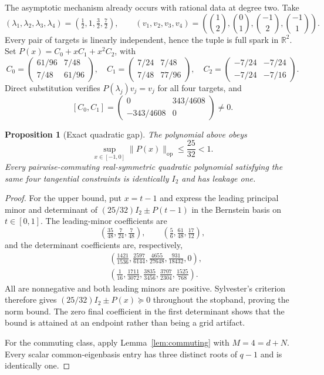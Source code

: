 \documentclass[11pt]{article}
\newtheorem{proposition}[theorem]{Proposition}
\theoremstyle{remark}
\newcommand{\R}{\mathbb{R}}
\newcommand{\op}{\mathrm{op}}
\begin{document}
The asymptotic mechanism already occurs with rational data at degree two.  Take
\[
 (\lambda_1,\lambda_2,\lambda_3,\lambda_4)
 =\left(\tfrac12,1,\tfrac32,\tfrac72\right),
 \qquad
 (v_1,v_2,v_3,v_4)
 =\left(
 \binom{1}{2},\binom{0}{1},\binom{-1}{2},\binom{-1}{1}
 \right).
\]
Every pair of targets is linearly independent, hence the tuple is full spark in
$\R^2$.  Set $P(x)=C_0+xC_1+x^2C_2$, with
\[
 C_0=\begin{pmatrix}61/96&7/48\\7/48&61/96\end{pmatrix},\quad
 C_1=\begin{pmatrix}7/24&7/48\\7/48&77/96\end{pmatrix},\quad
 C_2=\begin{pmatrix}-7/24&-7/24\\-7/24&-7/16\end{pmatrix}.
\]
Direct substitution verifies $P(\lambda_j)v_j=v_j$ for all four targets, and
\[
 [C_0,C_1]
 =\begin{pmatrix}0&343/4608\\-343/4608&0\end{pmatrix}\ne0.
\]

\begin{proposition}[Exact quadratic gap]\label{prop:quadratic}
The polynomial above obeys
\[
 \sup_{x\in[-1,0]}\|P(x)\|_{\op}\le\frac{25}{32}<1.
\]
Every pairwise-commuting real-symmetric quadratic polynomial satisfying the
same four tangential constraints is identically $I_2$ and has leakage one.
\end{proposition}

\begin{proof}
For the upper bound, put $x=t-1$ and express the leading principal minor and
determinant of $(25/32)I_2\pm P(t-1)$ in the Bernstein basis on $t\in[0,1]$.
The leading-minor coefficients are
\[
 \left(\tfrac{35}{48},\tfrac7{24},\tfrac7{48}\right),\qquad
 \left(\tfrac56,\tfrac{61}{48},\tfrac{17}{12}\right),
\]
and the determinant coefficients are, respectively,
\begin{align*}
 &\left(\tfrac{1421}{1536},\tfrac{2597}{6144},\tfrac{4655}{27648},
          \tfrac{931}{18432},0\right),\\
 &\left(\tfrac1{16},\tfrac{1711}{3072},\tfrac{3835}{3456},
          \tfrac{3707}{2304},\tfrac{1525}{768}\right).
\end{align*}
All are nonnegative and both leading minors are positive.  Sylvester's
criterion therefore gives $(25/32)I_2\pm P(x)\succeq0$ throughout the
stopband, proving the norm bound.  The zero final coefficient in the first
determinant shows that the bound is attained at an endpoint rather than being
a grid artifact.

For the commuting class, apply Lemma~\ref{lem:commuting} with
$M=4=d+N$.  Every scalar common-eigenbasis entry has three distinct roots of
$q-1$ and is identically one.
\end{proof}
\end{document}

